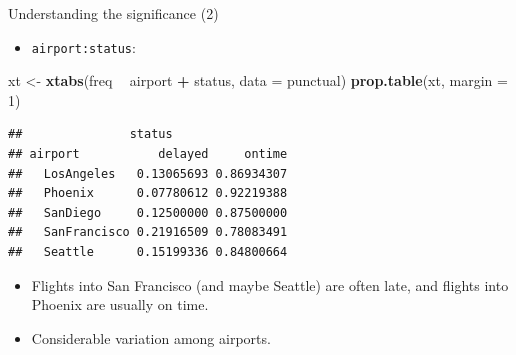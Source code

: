 \documentclass[ignorenonframetext,]{beamer}
\newenvironment{Shaded}{\begin{snugshade}}{\end{snugshade}}
\newcommand{\DataTypeTok}[1]{\textcolor[rgb]{0.13,0.29,0.53}{#1}}
\newcommand{\DecValTok}[1]{\textcolor[rgb]{0.00,0.00,0.81}{#1}}
\newcommand{\KeywordTok}[1]{\textcolor[rgb]{0.13,0.29,0.53}{\textbf{#1}}}
\newcommand{\NormalTok}[1]{#1}
\newcommand{\OperatorTok}[1]{\textcolor[rgb]{0.81,0.36,0.00}{\textbf{#1}}}
\newcommand{\StringTok}[1]{\textcolor[rgb]{0.31,0.60,0.02}{#1}}
\providecommand{\tightlist}{%
  \setlength{\itemsep}{0pt}\setlength{\parskip}{0pt}}
\begin{document}
\begin{frame}[fragile]{Understanding the significance (2)}
\protect\hypertarget{understanding-the-significance-2}{}

\begin{itemize}
\tightlist
\item
  \texttt{airport:status}:
\end{itemize}

\begin{Shaded}
\begin{Highlighting}[]
\NormalTok{xt <-}\StringTok{ }\KeywordTok{xtabs}\NormalTok{(freq }\OperatorTok{~}\StringTok{ }\NormalTok{airport }\OperatorTok{+}\StringTok{ }\NormalTok{status, }\DataTypeTok{data =}\NormalTok{ punctual)}
\KeywordTok{prop.table}\NormalTok{(xt, }\DataTypeTok{margin =} \DecValTok{1}\NormalTok{)}
\end{Highlighting}
\end{Shaded}

\begin{verbatim}
##               status
## airport           delayed     ontime
##   LosAngeles   0.13065693 0.86934307
##   Phoenix      0.07780612 0.92219388
##   SanDiego     0.12500000 0.87500000
##   SanFrancisco 0.21916509 0.78083491
##   Seattle      0.15199336 0.84800664
\end{verbatim}

\begin{itemize}
\item
  Flights into San Francisco (and maybe Seattle) are often late, and
  flights into Phoenix are usually on time.
\item
  Considerable variation among airports.
\end{itemize}

\end{frame}
\end{document}
